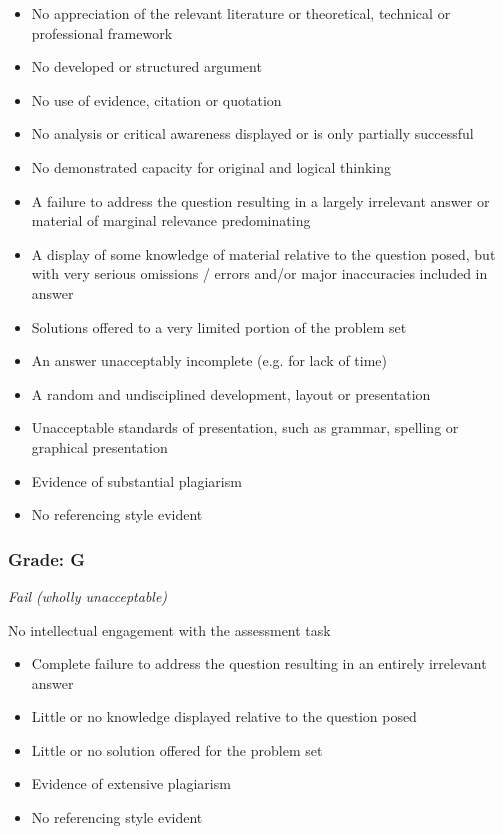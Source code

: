 \begin{itemize}
	\item No appreciation of the relevant literature or theoretical, technical or professional framework
	\item No developed or structured argument
	\item No use of evidence, citation or quotation
	\item No analysis or critical awareness displayed or is only partially successful
	\item No demonstrated capacity for original and logical thinking
	\item A failure to address the question resulting in a largely irrelevant answer or material of marginal relevance predominating
	\item A display of some knowledge of material relative to the question posed, but with very serious omissions / errors and/or major inaccuracies included in answer
	\item Solutions offered to a very limited portion of the problem set
	\item An answer unacceptably incomplete (e.g. for lack of time)
	\item A random and undisciplined development, layout or presentation
	\item Unacceptable standards of presentation, such as grammar, spelling or graphical presentation
	\item Evidence of substantial plagiarism
	\item No referencing style evident
\end{itemize}

\subsubsection*{Grade: G}

\textit{Fail (wholly unacceptable)}

No intellectual engagement with the assessment task

\begin{itemize}
	\item Complete failure to address the question resulting in an entirely irrelevant answer
	\item Little or no knowledge displayed relative to the question posed
	\item Little or no solution offered for the problem set
	\item Evidence of extensive plagiarism
	\item No referencing style evident
\end{itemize}

